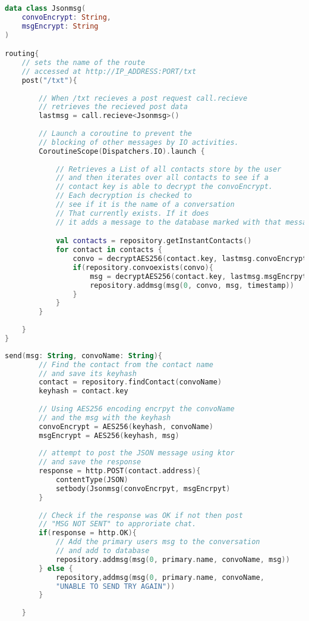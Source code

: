 \documentclass[../main/main.tex]{subfiles}
\begin{document}
\begin{lstlisting}[caption={Psuedocode for /txt.}, label={lst:example5}, language=Kotlin]
data class Jsonmsg(
	convoEncrypt: String,
	msgEncrypt: String
)

routing{
	// sets the name of the route
	// accessed at http://IP_ADDRESS:PORT/txt
	post("/txt"){
		
		// When /txt recieves a post request call.recieve
		// retrieves the recieved post data
		lastmsg = call.recieve<Jsonmsg>()
		
		// Launch a coroutine to prevent the 
		// blocking of other messages by IO activities.
		CoroutineScope(Dispatchers.IO).launch {
					   
			// Retrieves a List of all contacts store by the user
			// and then iterates over all contacts to see if a
			// contact key is able to decrypt the convoEncrypt.
			// Each decryption is checked to 
			// see if it is the name of a conversation
			// That currently exists. If it does
			// it adds a message to the database marked with that messageID					   

			val contacts = repository.getInstantContacts()
			for contact in contacts {
				convo = decryptAES256(contact.key, lastmsg.convoEncrypt)
				if(repository.convoexists(convo){
					msg = decryptAES256(contact.key, lastmsg.msgEncrpyt)
					repository.addmsg(msg(0, convo, msg, timestamp))
				}
		 	}	
        }		
		
	}
}
\end{lstlisting}

\begin{lstlisting}[caption={Psuedocode for send().}, label={lst:example5}, language=Kotlin]
	send(msg: String, convoName: String){
		// Find the contact from the contact name
		// and save its keyhash
		contact = repository.findContact(convoName)
		keyhash = contact.key
		
		// Using AES256 encoding encrpyt the convoName 
		// and the msg with the keyhash
		convoEncrypt = AES256(keyhash, convoName)
		msgEncrypt = AES256(keyhash, msg)
		
		// attempt to post the JSON message using ktor 
		// and save the response
		response = http.POST(contact.address){
			contentType(JSON)
			setbody(Jsonmsg(convoEncrpyt, msgEncrpyt)		
		}
		
		// Check if the response was OK if not then post
		// "MSG NOT SENT" to approriate chat.
		if(response = http.OK){
			// Add the primary users msg to the conversation
			// and add to database
			repository.addmsg(msg(0, primary.name, convoName, msg))
		} else {
			repository,addmsg(msg(0, primary.name, convoName, 
			"UNABLE TO SEND TRY AGAIN"))
		}
		
	}
		
\end{lstlisting}
\end{document}
